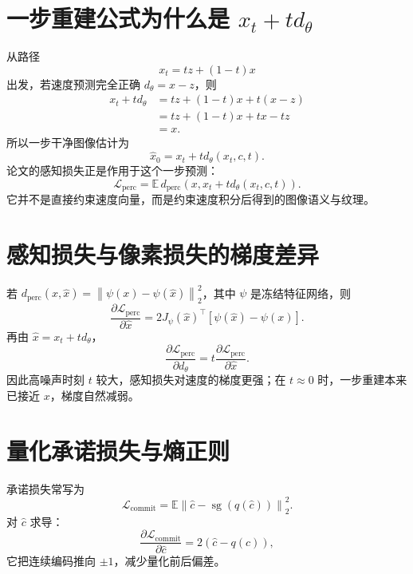\documentclass[UTF8,12pt,a4paper,fontset=none]{ctexart}
\numberwithin{equation}{section}
\newcommand{\E}{\mathbb{E}}
\newcommand{\Loss}{\mathcal{L}}
\newcommand{\norm}[1]{\left\lVert #1\right\rVert}
\newcommand{\sg}{\operatorname{sg}}
\begin{document}
\section{一步重建公式为什么是 $x_t+t d_\theta$}
从路径
\begin{equation}
 x_t=t z+(1-t)x
\end{equation}
出发，若速度预测完全正确 $d_\theta=x-z$，则
\begin{align}
 x_t+t d_\theta
 &=tz+(1-t)x+t(x-z)\\
 &=tz+(1-t)x+tx-tz\\
 &=x.
\end{align}
所以一步干净图像估计为
\begin{equation}
 \boxed{\hat x_0=x_t+t d_\theta(x_t,c,t).}
\end{equation}
论文的感知损失正是作用于这个一步预测：
\begin{equation}
 \Loss_{\mathrm{perc}}
 =\E\,d_{\mathrm{perc}}\!\left(x,x_t+t d_\theta(x_t,c,t)\right).
\end{equation}
它并不是直接约束速度向量，而是约束速度积分后得到的图像语义与纹理。

\section{感知损失与像素损失的梯度差异}
若 $d_{\mathrm{perc}}(x,\hat x)=\norm{\psi(x)-\psi(\hat x)}_2^2$，其中 $\psi$ 是冻结特征网络，则
\begin{equation}
 \frac{\partial\Loss_{\mathrm{perc}}}{\partial \hat x}
 =2J_\psi(\hat x)^\top\left[\psi(\hat x)-\psi(x)\right].
\end{equation}
再由 $\hat x=x_t+t d_\theta$，
\begin{equation}
 \frac{\partial\Loss_{\mathrm{perc}}}{\partial d_\theta}
 =t\frac{\partial\Loss_{\mathrm{perc}}}{\partial\hat x}.
\end{equation}
因此高噪声时刻 $t$ 较大，感知损失对速度的梯度更强；在 $t\approx0$ 时，一步重建本来已接近 $x$，梯度自然减弱。

\section{量化承诺损失与熵正则}
承诺损失常写为
\begin{equation}
 \Loss_{\mathrm{commit}}
 =\E\norm{\hat c-\sg(q(\hat c))}_2^2.
\end{equation}
对 $\hat c$ 求导：
\begin{equation}
 \frac{\partial\Loss_{\mathrm{commit}}}{\partial\hat c}
 =2\left(\hat c-q(\hat c)\right),
\end{equation}
它把连续编码推向 $\pm1$，减少量化前后偏差。
\end{document}
